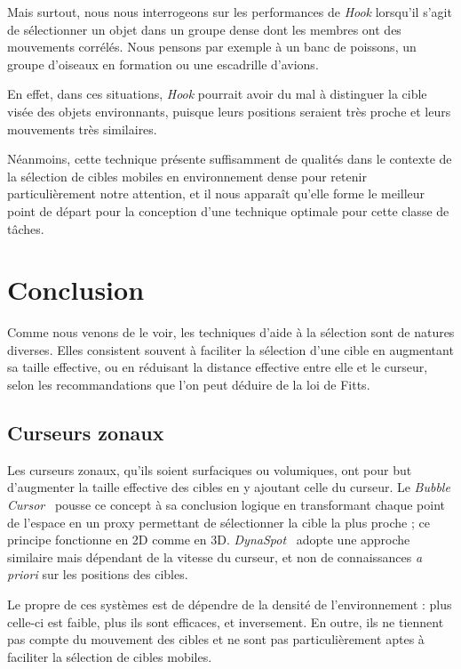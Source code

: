 	Mais surtout, nous nous interrogeons sur les performances de \emph{Hook} lorsqu'il s'agit de sélectionner un objet dans un groupe dense dont les membres ont des mouvements corrélés. Nous pensons par exemple à un banc de poissons, un groupe d'oiseaux en formation ou une escadrille d'avions.
	
	En effet, dans ces situations, \emph{Hook} pourrait avoir du mal à distinguer la cible visée des objets environnants, puisque leurs positions seraient très proche et leurs mouvements très similaires.
	
	Néanmoins, cette technique présente suffisamment de qualités dans le contexte de la sélection de cibles mobiles en environnement dense pour retenir particulièrement notre attention, et il nous apparaît qu'elle forme le meilleur point de départ pour la conception d'une technique optimale pour cette classe de tâches.
	
\section{Conclusion}
    Comme nous venons de le voir, les techniques d'aide à la sélection sont de natures diverses. Elles consistent souvent à faciliter la sélection d'une cible en augmentant sa taille effective, ou en réduisant la distance effective entre elle et le curseur, selon les recommandations que l'on peut déduire de la loi de Fitts.
    
    \subsection{Curseurs zonaux}
    Les curseurs zonaux, qu'ils soient surfaciques ou volumiques, ont pour but d'augmenter la taille effective des cibles en y ajoutant celle du curseur. Le \emph{Bubble Cursor}~\cite{grossman2005bubble} pousse ce concept à sa conclusion logique en transformant chaque point de l'espace en un proxy permettant de sélectionner la cible la plus proche ; ce principe fonctionne en 2D comme en 3D. \emph{DynaSpot}~\cite{chapuis2009dynaspot} adopte une approche similaire mais dépendant de la vitesse du curseur, et non de connaissances \emph{a priori} sur les positions des cibles.
    
    Le propre de ces systèmes est de dépendre de la densité de l'environnement : plus celle-ci est faible, plus ils sont efficaces, et inversement. En outre, ils ne tiennent pas compte du mouvement des cibles et ne sont pas particulièrement aptes à faciliter la sélection de cibles mobiles.
    
